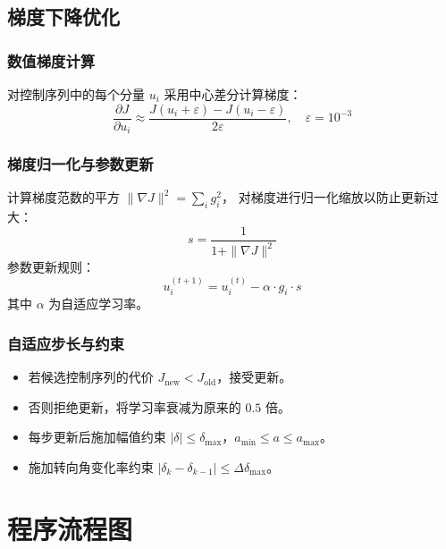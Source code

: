 \documentclass[a4paper,10pt]{article}
\begin{document}
\subsection{梯度下降优化}

\subsubsection{数值梯度计算}

对控制序列中的每个分量 $u_i$ 采用中心差分计算梯度：
\begin{equation}
  \frac{\partial J}{\partial u_i} \approx \frac{J(u_i + \varepsilon) - J(u_i - \varepsilon)}{2\varepsilon},
  \quad \varepsilon = 10^{-3}
\end{equation}

\subsubsection{梯度归一化与参数更新}

计算梯度范数的平方 $\|\nabla J\|^2 = \sum_i g_i^2$，
对梯度进行归一化缩放以防止更新过大：
\begin{equation}
  s = \frac{1}{1 + \|\nabla J\|^2}
\end{equation}
参数更新规则：
\begin{equation}
  u_i^{(t+1)} = u_i^{(t)} - \alpha \cdot g_i \cdot s
\end{equation}
其中 $\alpha$ 为自适应学习率。

\subsubsection{自适应步长与约束}

\begin{itemize}
  \item 若候选控制序列的代价 $J_{\text{new}} < J_{\text{old}}$，接受更新。
  \item 否则拒绝更新，将学习率衰减为原来的 $0.5$ 倍。
  \item 每步更新后施加幅值约束 $|\delta| \leq \delta_{\max}$，$a_{\min} \leq a \leq a_{\max}$。
  \item 施加转向角变化率约束 $|\delta_k - \delta_{k-1}| \leq \Delta\delta_{\max}$。
\end{itemize}

\section{程序流程图}
\end{document}
